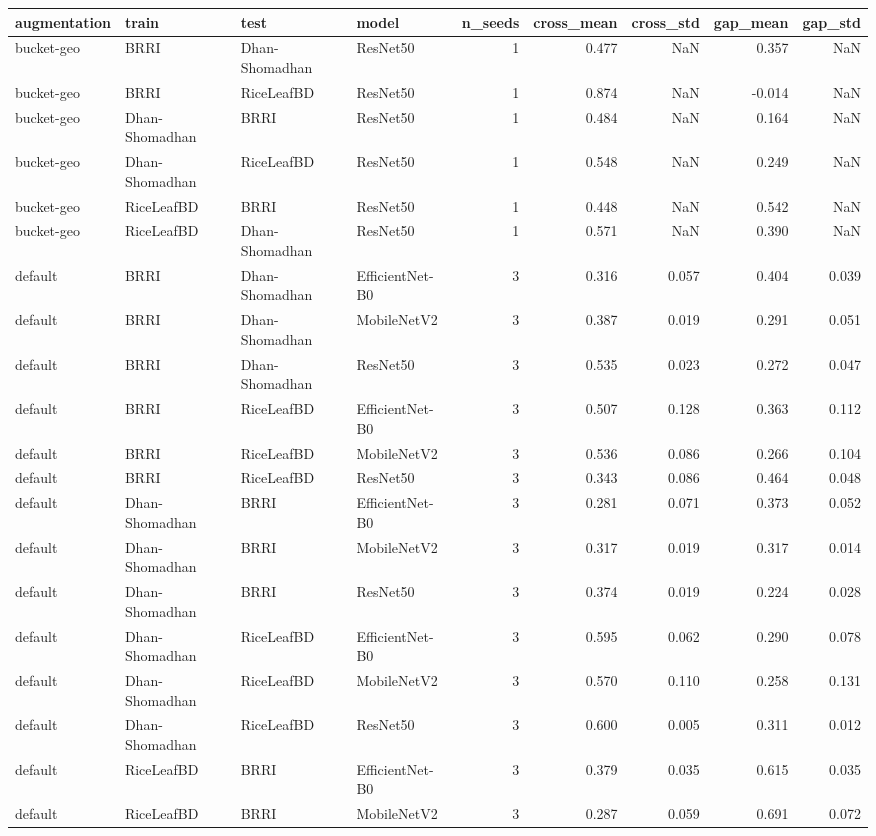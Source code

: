 \begin{tabular}{llllrrrrr}
\toprule
augmentation & train & test & model & n_seeds & cross_mean & cross_std & gap_mean & gap_std \\
\midrule
bucket-geo & BRRI & Dhan-Shomadhan & ResNet50 & 1 & 0.477 & NaN & 0.357 & NaN \\
bucket-geo & BRRI & RiceLeafBD & ResNet50 & 1 & 0.874 & NaN & -0.014 & NaN \\
bucket-geo & Dhan-Shomadhan & BRRI & ResNet50 & 1 & 0.484 & NaN & 0.164 & NaN \\
bucket-geo & Dhan-Shomadhan & RiceLeafBD & ResNet50 & 1 & 0.548 & NaN & 0.249 & NaN \\
bucket-geo & RiceLeafBD & BRRI & ResNet50 & 1 & 0.448 & NaN & 0.542 & NaN \\
bucket-geo & RiceLeafBD & Dhan-Shomadhan & ResNet50 & 1 & 0.571 & NaN & 0.390 & NaN \\
default & BRRI & Dhan-Shomadhan & EfficientNet-B0 & 3 & 0.316 & 0.057 & 0.404 & 0.039 \\
default & BRRI & Dhan-Shomadhan & MobileNetV2 & 3 & 0.387 & 0.019 & 0.291 & 0.051 \\
default & BRRI & Dhan-Shomadhan & ResNet50 & 3 & 0.535 & 0.023 & 0.272 & 0.047 \\
default & BRRI & RiceLeafBD & EfficientNet-B0 & 3 & 0.507 & 0.128 & 0.363 & 0.112 \\
default & BRRI & RiceLeafBD & MobileNetV2 & 3 & 0.536 & 0.086 & 0.266 & 0.104 \\
default & BRRI & RiceLeafBD & ResNet50 & 3 & 0.343 & 0.086 & 0.464 & 0.048 \\
default & Dhan-Shomadhan & BRRI & EfficientNet-B0 & 3 & 0.281 & 0.071 & 0.373 & 0.052 \\
default & Dhan-Shomadhan & BRRI & MobileNetV2 & 3 & 0.317 & 0.019 & 0.317 & 0.014 \\
default & Dhan-Shomadhan & BRRI & ResNet50 & 3 & 0.374 & 0.019 & 0.224 & 0.028 \\
default & Dhan-Shomadhan & RiceLeafBD & EfficientNet-B0 & 3 & 0.595 & 0.062 & 0.290 & 0.078 \\
default & Dhan-Shomadhan & RiceLeafBD & MobileNetV2 & 3 & 0.570 & 0.110 & 0.258 & 0.131 \\
default & Dhan-Shomadhan & RiceLeafBD & ResNet50 & 3 & 0.600 & 0.005 & 0.311 & 0.012 \\
default & RiceLeafBD & BRRI & EfficientNet-B0 & 3 & 0.379 & 0.035 & 0.615 & 0.035 \\
default & RiceLeafBD & BRRI & MobileNetV2 & 3 & 0.287 & 0.059 & 0.691 & 0.072 \\

\end{tabular}
